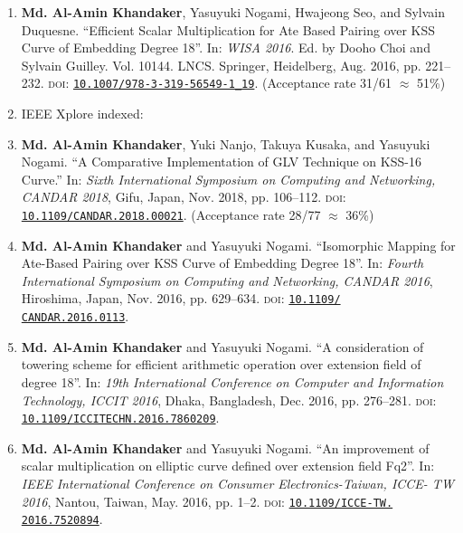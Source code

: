 \begin{enumerate}
	\item \textbf{Md. Al-Amin Khandaker}, Yasuyuki Nogami, Hwajeong Seo, and Sylvain Duquesne. ``Efficient Scalar Multiplication for Ate Based Pairing over KSS Curve of Embedding Degree 18''. In: \textit{WISA 2016}. Ed. by Dooho Choi and Sylvain Guilley. Vol. 10144. LNCS. Springer, Heidelberg, Aug. 2016, pp. 221–232. \textsc{doi}: \href{https://doi.org/10.1007/978-3-319-56549-1\_19}{\texttt{10.1007/978-3-319-56549-1\_19}}.
	(Acceptance rate 31/61 $\approx$ 51\%)
	\vspace{5mm}
	\item[ ] \Large IEEE Xplore indexed:
	\normalsize
	\item \textbf{Md. Al-Amin Khandaker}, Yuki Nanjo, Takuya Kusaka, and Yasuyuki Nogami. ``A Comparative Implementation of GLV Technique on KSS-16 Curve.'' In:  \textit{Sixth International Symposium on Computing and Networking, CANDAR 2018}, Gifu, Japan, Nov. 2018, pp. 106–112. \textsc{doi}: \href{https://doi.org/10.1109/CANDAR.2018.00021}{\texttt{10.1109/CANDAR.2018.00021}}. (Acceptance rate 28/77 $\approx$ 36\%)
	
	\item \textbf{Md. Al-Amin Khandaker} and Yasuyuki Nogami. “Isomorphic Mapping for Ate-Based Pairing over KSS Curve of Embedding Degree 18”. In: \textit{Fourth International Symposium on Computing and Networking, CANDAR 2016}, Hiroshima, Japan, Nov. 2016, pp. 629–634. \textsc{doi}: \href{https://doi.org/10. 1109/CANDAR.2016.0113}{\texttt{10.1109/\\CANDAR.2016.0113}}.
	
	\item  \textbf{Md. Al-Amin Khandaker} and Yasuyuki Nogami. ``A consideration of towering scheme for efficient arithmetic operation over extension field of degree 18''. In: \textit{19th International Conference on Computer and Information Technology, ICCIT 2016}, Dhaka, Bangladesh, Dec. 2016, pp. 276–281. \textsc{doi}: \href{https://doi.org/10.1109/ICCITECHN.2016.7860209}{\texttt{10.1109/ICCITECHN.2016.7860209}}.
	
	\item \textbf{Md. Al-Amin Khandaker} and Yasuyuki Nogami. ``An improvement of scalar multiplication on elliptic curve defined over extension field Fq2''. In: \textit{IEEE International Conference on Consumer Electronics-Taiwan, ICCE- TW 2016}, Nantou, Taiwan, May. 2016, pp. 1–2. \textsc{doi}: \href{https://doi.org/10.1109/ICCE-TW.2016.7520894}{\texttt{10.1109/ICCE-TW.\\2016.7520894}}.
	

\end{enumerate}
